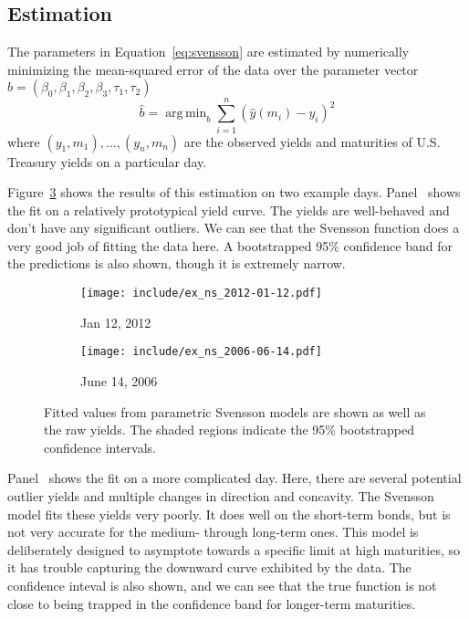 \documentclass[12pt]{article}
\DeclareMathOperator*{\argmin}{arg\,min}
\begin{document}
\subsection{Estimation}

The parameters in Equation~\ref{eq:svensson} are estimated by numerically minimizing the mean-squared error of the data over the parameter vector $b = (\beta_0, \beta_1, \beta_2, \beta_3, \tau_1, \tau_2)$
\begin{equation*}
\hat{b} = \argmin_{b} \sum_{i=1}^n \left( \hat{y}(m_i) - y_i \right)^2
\end{equation*}
where $(y_1, m_1), \dots, (y_n, m_n)$ are the observed yields and maturities of U.S. Treasury yields on a particular day.

Figure~\ref{fig:ex_ns} shows the results of this estimation on two example days. Panel~ shows the fit on a relatively prototypical yield curve. The yields are well-behaved and don't have any significant outliers. We can see that the Svensson function does a very good job of fitting the data here. A bootstrapped 95\% confidence band for the predictions is also shown, though it is extremely narrow.

\begin{figure}[htb] \centering
    \begin{subfigure}[t]{.49\linewidth}
        \texttt{[image: include/ex\_ns\_2012-01-12.pdf]}
        \caption{Jan 12, 2012} \label{fig:ex_ns_1-12-2012}
    \end{subfigure}
    \begin{subfigure}[t]{.49\linewidth}
        \texttt{[image: include/ex\_ns\_2006-06-14.pdf]}
        \caption{June 14, 2006} \label{fig:ex_ns_6-14-2006}
    \end{subfigure}
    \caption{Fitted values from parametric Svensson models are shown as well as the raw yields. The shaded regions indicate the 95\% bootstrapped confidence intervals.}
    \label{fig:ex_ns}
\end{figure}

Panel~ shows the fit on a more complicated day. Here, there are several potential outlier yields and multiple changes in direction and concavity. The Svensson model fits these yields very poorly. It does well on the short-term bonds, but is not very accurate for the medium- through long-term ones. This model is deliberately designed to asymptote towards a specific limit at high maturities, so it has trouble capturing the downward curve exhibited by the data. The confidence inteval is also shown, and we can see that the true function is not close to being trapped in the confidence band for longer-term maturities.
\end{document}
